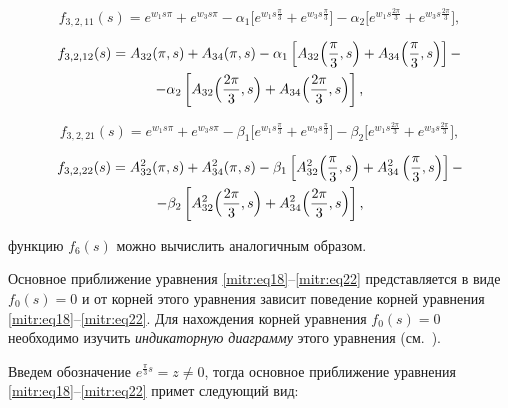 $$

f_{3,2,11} (s)=e^{w_1s\pi}+e^{w_3s\pi}-\alpha_1\Big[e^{w_1s\frac\pi3}+

e^{w_3s\frac\pi3}\Big]-\alpha_2

\Big[e^{w_1s\frac{2\pi}3}+e^{w_3s\frac{2\pi}3}\Big],$$

\begin{multline}

f_{3,2,12} (s)=A_{32}(\pi,s)+A_{34}(\pi,s)-\alpha_1\left[A_{32}\Bigl(\frac\pi3,s\Bigr)+

A_{34}\Bigl(\frac\pi3,s\Bigr)\right] -\\-\alpha_2 \left[A_{32}\Bigl(\frac{2\pi}3,s\Bigr)+A_{34}

\Bigl(\frac{2\pi}3,s\Bigr)\right],

\end{multline}

$$

f_{3,2,21} (s)=e^{w_1s\pi}+e^{w_3s\pi}-\beta_1\Big[e^{w_1s\frac\pi3}+

e^{w_3s\frac\pi3}\Big]-\beta_2\Big[e^{w_1s\frac{2\pi}3}+e^{w_3s\frac{2\pi}3}\Big],

$$

\begin{multline}

f_{3,2,22} (s)=A^2_{32}(\pi,s)+A^2_{34}(\pi,s)-\beta_1\left[A^2_{32}\Bigl(\frac\pi3,s\Bigr)+

A^2_{34}\left(\frac\pi3,s\right)\right] -\\-\beta_2 \left[A^2_{32}\Bigl(\frac{2\pi}3,s\Bigr)+A^2_{34}

\Bigl(\frac{2\pi}3,s\Bigr)\right],

\end{multline}


функцию $f_6(s)$ можно вычислить аналогичным образом.





Основное приближение  уравнения \eqref{mitr:eq18}--\eqref{mitr:eq22} представляется в виде ${f_0(s){=}0}$ и от корней этого уравнения зависит поведение корней уравнения \eqref{mitr:eq18}--\eqref{mitr:eq22}. Для нахождения корней уравнения $f_0(s)=0$ необходимо изучить \textit{индикаторную диаграмму} этого уравнения (см.~\cite[гл.~12]{mitr:bib18}).



Введем обозначение $e^{\frac\pi3s}=z\ne0$, тогда основное приближение уравнения \eqref{mitr:eq18}--\eqref{mitr:eq22} примет следующий вид:

